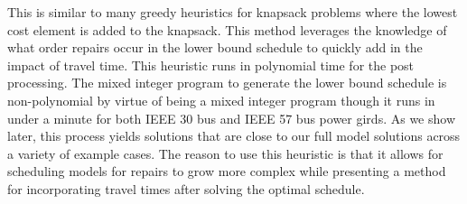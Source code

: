 This is  similar to many greedy heuristics for knapsack problems where the lowest cost element is added to the knapsack. This method leverages the knowledge of what order repairs occur in the lower bound schedule to quickly add in the impact of travel time. This heuristic runs in polynomial time for the post processing. The  mixed integer program to generate the lower bound schedule is non-polynomial by virtue of being a mixed integer program though it runs in under a minute for both IEEE 30 bus and IEEE 57 bus power girds. As we show later, this process yields solutions that are close to our full model solutions across a variety of example cases. The reason to use this heuristic is that it allows for scheduling models for repairs to grow more complex while presenting a method for incorporating travel times after solving the optimal schedule.

